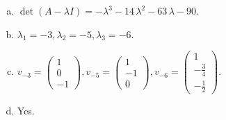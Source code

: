 \begin{questions}
\begin{solution}
\begin{enumerate}[(a)]
\item $\det(A-\lambda I)=-{\lambda}^{3} - 14 \, {\lambda}^{2} - 63 \, {\lambda} - 90$.
\item ${\lambda}_1=-3, {\lambda}_2=-5, {\lambda}_3=-6$.
\item $v_{-3}=\left(\begin{array}{r}
1 \\
0 \\
-1
\end{array}\right), v_{-5}=\left(\begin{array}{r}
1 \\
-1 \\
0
\end{array}\right), v_{-6}=\left(\begin{array}{r}
1 \\
-\frac{3}{4} \\
-\frac{1}{2}
\end{array}\right)$.
\item Yes.
\end{enumerate}
\end{solution}

\end{questions}

\newpage


\begin{center}
\end{center}

